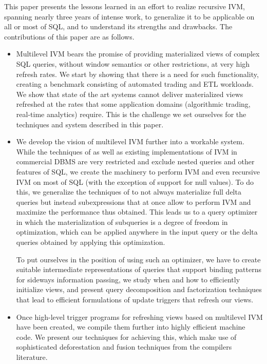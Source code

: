 This paper presents the lessons learned in an effort to realize recursive IVM, spanning nearly three years of intense work, to generalize it to be applicable on all or most of SQL, and to understand its strengths and drawbacks.
The contributions of this paper are as follows.
\begin{itemize}
\item
Multilevel IVM bears the promise of providing materialized views of complex SQL queries, without
window semantics or other restrictions, at very high refresh rates. We start by showing that there is
a need for such functionality, creating a benchmark consisting of automated trading and ETL workloads.
We show that state of the art systems cannot deliver materialized views refreshed at the rates
that some application domains (algorithmic trading, real-time analytics) require.
This is the challenge we set ourselves for the techniques and system described in this paper.

\item
We develop the vision of multilevel IVM further into a workable system.
While the techniques of \cite{ahmad-vldb:09, koch-pods:10} as well as existing implementations of
IVM in commercial DBMS are very restricted and exclude nested queries and other features of SQL,
we create the machinery to perform IVM and even recursive IVM on most of SQL (with the exception of
support for null values). To do this, we generalize the techniques of \cite{ahmad-vldb:09, koch-pods:10}
to not always materialize full delta queries but instead subexpressions that at once allow to perform
IVM and maximize the performance thus obtained. This leads us to a query optimizer in which
the materialization of subqueries is a degree of freedom in optimization, which can be applied anywhere
in the input query or the delta queries obtained by applying this optimization.

To put ourselves in the position of using such an optimizer, we have to create suitable
intermediate representations of queries that support binding patterns for sideways information
passing, we study when and how to efficiently initialize views, and present query decomposition
and factorization techniques that lead to efficient formulations of update triggers that refresh our
views.

\item
Once high-level trigger programs for refreshing views based on multilevel IVM have been created,
we compile them further into highly efficient machine code.
We present our techniques for achieving this, which make use of sophisticated deforestation and
fusion techniques from the compilers literature.


\end{itemize}
